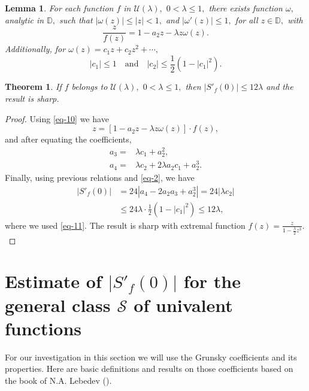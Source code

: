 \documentclass{amsart}
\newtheorem{thm}{Theorem}
\newtheorem{lem}{Lemma}
\begin{document}
\medskip

 \begin{lem}
 For each function $f$ in $\mathcal{U}(\lambda),$ $0< \lambda \leq 1,$ there exists function $\omega ,$ analytic in $\mathbb{D},$ such that $|\omega (z)|\leq |z| < 1,$ and $|\omega '(z)|\leq 1,$
 for all $z \in \mathbb{D},$ with
 \begin{equation}\label{eq-10}
 \frac{z}{f(z)} =1-a_2z-\lambda z\omega (z).
\end{equation}
 Additionally, for $\omega(z)=c_1z+c_2z^2+\cdots,$
 \begin{equation}\label{eq-11}
 |c_1|\leq 1\quad \mbox{and}\quad |c_2|\leq \frac{1}{2}(1-|c_1|^2).
 \end{equation}
\end{lem}

\medskip

\begin{thm}\label{th4}
If $f$ belongs to $\mathcal{U}(\lambda),$ $0< \lambda \leq 1,$ then $|S'_{f}(0)|\leq 12\lambda$
and the result is sharp.
\end{thm}

\begin{proof}
Using \eqref{eq-10} we have
\[
z =[1-a_2z-\lambda z\omega(z)]\cdot f(z),
\]
and after equating the coefficients,
\[
\begin{split}
a_3 =& \lambda c_1+a^2_2,\\
a_4=&\lambda c_2+2\lambda a_2c_1+a_2^3.
\end{split}
\]
Finally, using previous relations and \eqref{eq-2}, we have
\[
\begin{split}
|S'_{f}(0)|&=24|a_{4}-2a_{2}a_{3}+a_{2}^{3}|=24|\lambda c_{2}|\\
&\leq 24\lambda\cdot \frac{1}{2}(1-|c_1|^2) \leq12\lambda,
\end{split}
\]
where we used \eqref{eq-11}. The result is sharp with extremal function
$f(z)=\frac{z}{1-\frac{\lambda}{2}z^{3}}.$
\end{proof}

\medskip


\section{Estimate of $|S'_{f}(0)|$ for the general class $\mathcal{S}$ of univalent functions}

\medskip

For our investigation in this section we  will use the Grunsky coefficients and its properties. Here are basic definitions and results  on those coefficients based on the book of N.A. Lebedev (\cite{Lebedev}).
\end{document}
